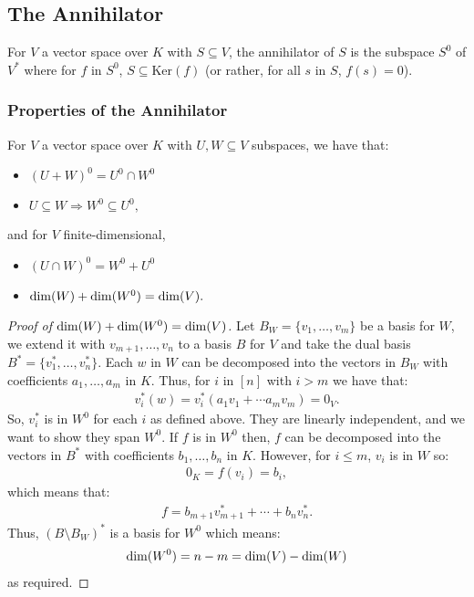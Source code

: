 \subsection{The Annihilator}

For $V$ a vector space over $K$ with $S \subseteq V$,
the annihilator of $S$ is the subspace $S^0$ of $V^*$ where
for $f$ in $S^0$, $S \subseteq \text{Ker}(f)$ (or rather, 
for all $s$ in $S$, $f(s) = 0$).

\subsubsection{Properties of the Annihilator}

For $V$ a vector space over $K$ with $U, W \subseteq V$
subspaces, we have that: \begin{itemize}
  \item $(U + W)^0 = U^0 \cap W^0$
  \item $U \subseteq W \Rightarrow W^0 \subseteq U^0,$
\end{itemize} and for $V$ finite-dimensional, \begin{itemize}
  \item $(U \cap W)^0 = W^0 + U^0$
  \item $\operatorname{dim}(W) + \operatorname{dim}(W^0) = \operatorname{dim}(V).$
\end{itemize}
\begin{proof}[Proof of $\operatorname{dim}(W) + \operatorname{dim}(W^0) = \operatorname{dim}(V)$]
    \hfill \newline
    Let $B_W = \{v_1, \ldots, v_m \}$ be a basis for $W$, we extend it with
    $v_{m + 1}, \ldots, v_n$ to a basis $B$ for $V$ and take the dual
    basis $B^* = \{v_1^*, \ldots, v_n^*\}$. Each $w$ in $W$ can be decomposed
    into the vectors in $B_W$ with coefficients $a_1, \ldots, a_m$ in
    $K$. Thus, for $i$ in $[n]$ with $i > m$ we have that: \begin{gather*}
        v_i^*(w) = v_i^*(a_1v_1 + \cdots a_mv_m) = 0_V.
    \end{gather*} So, $v_i^*$ is in $W^0$ for each $i$ as defined
    above. They are linearly independent, and we want to show they span
    $W^0$. If $f$ is in $W^0$ then, $f$ can be decomposed into the
    vectors in $B^*$ with coefficients $b_1, \ldots, b_n$ in $K$.
    However, for $i \leq m$, $v_i$ is in $W$ so: \begin{gather*}
        0_K = f(v_i) = b_i,
    \end{gather*} which means that: \begin{gather*}
        f = b_{m + 1}v_{m + 1}^* + \cdots + b_nv_n^*.
    \end{gather*} Thus, $(B \setminus B_W)^*$ is a basis for $W^0$
    which means: \begin{gather*}
        \operatorname{dim}(W^0) = n - m = \operatorname{dim}(V) - \operatorname{dim}(W)
    \end{gather*} as required.
\end{proof}

